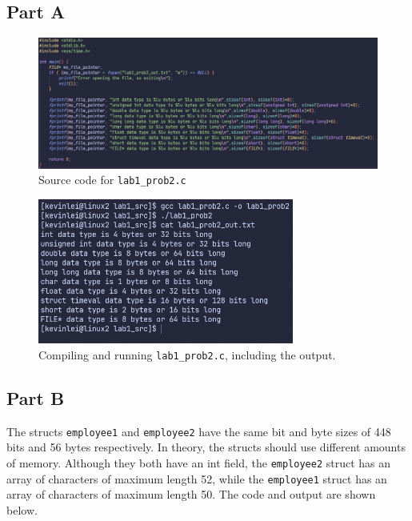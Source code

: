 \documentclass{article}
\begin{document}
\subsection{Part A}
\begin{figure}[H]
    \centering
    \includegraphics[width=1\textwidth]{./images/prob2parta1.png}
    \caption{Source code for \lstinline!lab1_prob2.c!}
\end{figure}

\begin{figure}[H]
    \centering
    \includegraphics[width=0.75\textwidth]{./images/prob2parta2.png}
    \caption{Compiling and running \lstinline!lab1_prob2.c!, including the output.}
\end{figure}

\newpage
\subsection{Part B}
The structs \lstinline!employee1! and \lstinline!employee2! have the same bit and byte sizes of  448 bits and 56 bytes respectively.
In theory, the structs should use different amounts of memory.
Although they both have an int field, the \lstinline!employee2! struct has an array of characters of maximum length 52, 
while the \lstinline!employee1! struct has an array of characters of maximum length 50.
The code and output are shown below.
\end{document}
